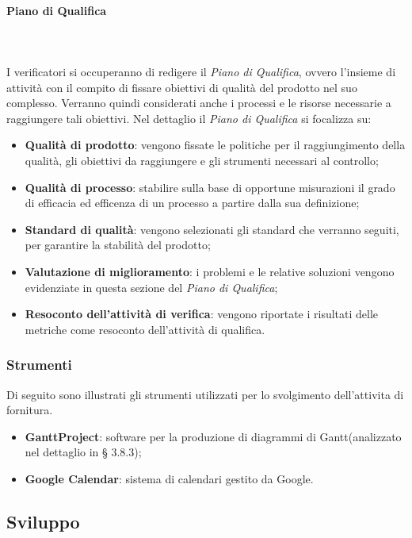 			\paragraph{Piano di Qualifica} \mbox{} \\ \mbox{} \\
			I verificatori si occuperanno di redigere il \textit{Piano di Qualifica}, ovvero l'insieme di attività con il compito di fissare obiettivi di qualità del prodotto nel suo complesso. Verranno quindi considerati anche i processi e le risorse necessarie a raggiungere tali obiettivi. Nel dettaglio il \textit{Piano di Qualifica} si focalizza su:
			\begin{itemize}
				\item \textbf{Qualità di prodotto}: vengono fissate le politiche per il raggiungimento della qualità, gli obiettivi da raggiungere e gli strumenti necessari al controllo;
				\item \textbf{Qualità di processo}: stabilire sulla base di opportune misurazioni il grado di efficacia ed efficenza di un processo a partire dalla sua definizione;
				\item \textbf{Standard di qualità}: vengono selezionati gli standard che verranno seguiti, per garantire la stabilità del prodotto;
				\item \textbf{Valutazione di miglioramento}: i problemi e le relative soluzioni vengono evidenziate in questa sezione del \textit{Piano di Qualifica};
				\item \textbf{Resoconto dell'attività di verifica}: vengono riportate i risultati delle metriche come resoconto dell'attività di qualifica.
			\end{itemize}
		\subsubsection{Strumenti}
		Di seguito sono illustrati gli strumenti utilizzati per lo svolgimento dell'attivita di fornitura.
		\begin{itemize}
			\item \textbf{GanttProject}: software per la produzione di diagrammi di Gantt\glo (analizzato nel dettaglio in § 3.8.3);
			\item \textbf{Google Calendar}: sistema di calendari gestito da Google.
		\end{itemize}

	\subsection{Sviluppo}

